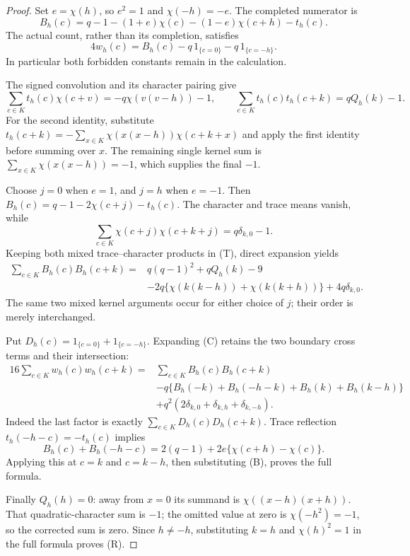 \documentclass[11pt]{article}
\begin{document}
\begin{proof}
Set \(e=\chi(h)\), so \(e^2=1\) and \(\chi(-h)=-e\). The completed
numerator is
\[
 B_h(c)=q-1-(1+e)\chi(c)-(1-e)\chi(c+h)-t_h(c).
\]
The actual count, rather than its completion, satisfies
\[
 4w_h(c)=B_h(c)-q\,1_{\{c=0\}}-q\,1_{\{c=-h\}}.             \tag{C}
\]
In particular both forbidden constants remain in the calculation.

The signed convolution and its character pairing give
\[
 \sum_{c\in K}t_h(c)\chi(c+v)
   =-q\chi(v(v-h))-1,
 \qquad
 \sum_{c\in K}t_h(c)t_h(c+k)=qQ_h(k)-1.                   \tag{T}
\]
For the second identity, substitute
\(t_h(c+k)=-\sum_{x\in K}\chi(x(x-h))\chi(c+k+x)\)
and apply the first identity before summing over \(x\).
The remaining single kernel sum is
\(\sum_{x\in K}\chi(x(x-h))=-1\), which supplies the final \(-1\).

Choose \(j=0\) when \(e=1\), and \(j=h\) when \(e=-1\). Then
\(B_h(c)=q-1-2\chi(c+j)-t_h(c)\). The character and trace means
vanish, while
\[
 \sum_{c\in K}\chi(c+j)\chi(c+k+j)=q\delta_{k,0}-1.
\]
Keeping both mixed trace--character products in (T), direct expansion yields
\begin{align*}
 \sum_{c\in K}B_h(c)B_h(c+k)
 ={}&q(q-1)^2+qQ_h(k)-9\\
 &-2q\{\chi(k(k-h))+\chi(k(k+h))\}+4q\delta_{k,0}. \tag{B}
\end{align*}
The same two mixed kernel arguments occur for either choice of \(j\);
their order is merely interchanged.

Put \(D_h(c)=1_{\{c=0\}}+1_{\{c=-h\}}\). Expanding (C) retains the
two boundary cross terms and their intersection:
\begin{align*}
 16\sum_{c\in K}w_h(c)w_h(c+k)
 ={}&\sum_{c\in K}B_h(c)B_h(c+k)\\
 &-q\{B_h(-k)+B_h(-h-k)+B_h(k)+B_h(k-h)\}\\
 &+q^2(2\delta_{k,0}+\delta_{k,h}+\delta_{k,-h}).
\end{align*}
Indeed the last factor is exactly \(\sum_{c\in K}D_h(c)D_h(c+k)\).
Trace reflection \(t_h(-h-c)=-t_h(c)\) implies
\[
 B_h(c)+B_h(-h-c)
 =2(q-1)+2e\{\chi(c+h)-\chi(c)\}.
\]
Applying this at \(c=k\) and \(c=k-h\), then substituting (B), proves
the full formula.

Finally \(Q_h(h)=0\): away from \(x=0\) its summand is
\(\chi((x-h)(x+h))\). That quadratic-character sum is \(-1\);
the omitted value at zero is \(\chi(-h^2)=-1\), so the corrected sum
is zero. Since \(h\ne-h\), substituting \(k=h\) and
\(\chi(h)^2=1\) in the full formula proves (R).
\end{proof}
\end{document}
